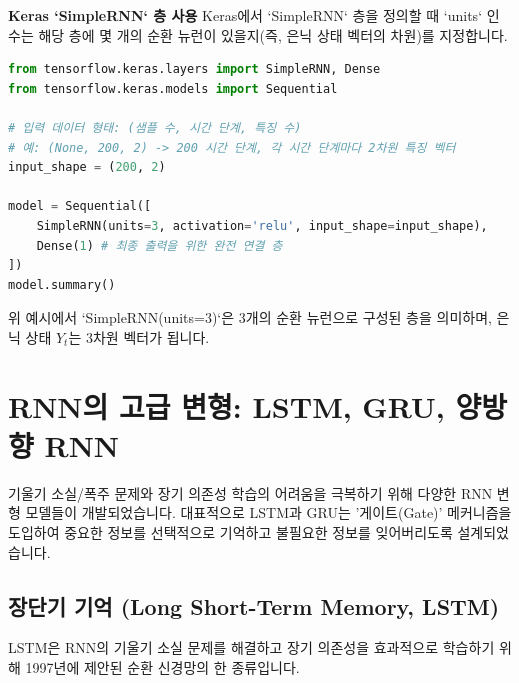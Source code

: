 \documentclass[11pt,a4paper]{article}
\begin{document}
\begin{enumerate}
    \begin{tipbox}
    \textbf{Keras `SimpleRNN` 층 사용}
    Keras에서 `SimpleRNN` 층을 정의할 때 `units` 인수는 해당 층에 몇 개의 순환 뉴런이 있을지(즉, 은닉 상태 벡터의 차원)를 지정합니다.
    \begin{lstlisting}[language=Python, caption=Keras SimpleRNN 층 정의 예시, label=lst:simplernn_layer]
from tensorflow.keras.layers import SimpleRNN, Dense
from tensorflow.keras.models import Sequential

# 입력 데이터 형태: (샘플 수, 시간 단계, 특징 수)
# 예: (None, 200, 2) -> 200 시간 단계, 각 시간 단계마다 2차원 특징 벡터
input_shape = (200, 2) 

model = Sequential([
    SimpleRNN(units=3, activation='relu', input_shape=input_shape),
    Dense(1) # 최종 출력을 위한 완전 연결 층
])
model.summary()
    \end{lstlisting}
    위 예시에서 `SimpleRNN(units=3)`은 3개의 순환 뉴런으로 구성된 층을 의미하며, 은닉 상태 $Y_t$는 3차원 벡터가 됩니다.
    \end{tipbox}
\end{enumerate}

\newpage
\section{RNN의 고급 변형: LSTM, GRU, 양방향 RNN}
기울기 소실/폭주 문제와 장기 의존성 학습의 어려움을 극복하기 위해 다양한 RNN 변형 모델들이 개발되었습니다. 대표적으로 LSTM과 GRU는 '게이트(Gate)' 메커니즘을 도입하여 중요한 정보를 선택적으로 기억하고 불필요한 정보를 잊어버리도록 설계되었습니다.

\subsection{장단기 기억 (Long Short-Term Memory, LSTM)}
LSTM은 RNN의 기울기 소실 문제를 해결하고 장기 의존성을 효과적으로 학습하기 위해 1997년에 제안된 순환 신경망의 한 종류입니다.
\end{document}
